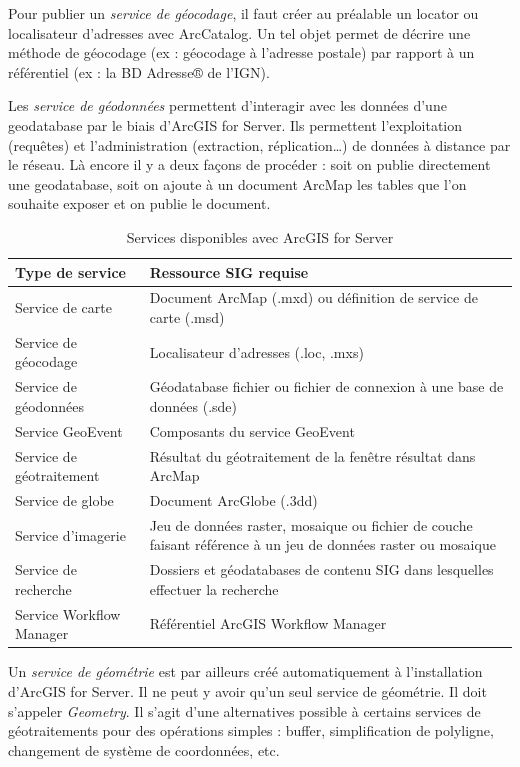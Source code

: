 \documentclass[11pt]{article}
\begin{document}
Pour publier un \textit{service de géocodage}, il faut créer au préalable un locator ou localisateur d'adresses avec ArcCatalog. Un tel objet permet de décrire une méthode de géocodage (ex : géocodage à l'adresse postale) par rapport à un référentiel (ex : la BD Adresse® de l'IGN).

Les \textit{service de géodonnées} permettent d'interagir avec les données d'une geodatabase par le biais d'ArcGIS for Server. Ils permettent l'exploitation (requêtes) et l'administration (extraction, réplication…) de données à distance par le réseau. Là encore il y a deux façons de procéder : soit on publie directement une geodatabase, soit on ajoute à un document ArcMap les tables que l'on souhaite exposer et on publie le document.

\begin{table}[H]
	\begin{center}
		{\renewcommand{\arraystretch}{1.3}
		\begin{tabular}{|l|p{7 cm}|}
			\hline 
			\textbf{Type de service} & \textbf{Ressource SIG requise} \\
			\hline
			Service de carte & Document ArcMap (.mxd) ou définition de service de carte (.msd) \\
			Service de géocodage & Localisateur d'adresses (.loc, .mxs) \\
			Service de géodonnées & Géodatabase fichier ou fichier de connexion à une base de données (.sde) \\
			Service GeoEvent & Composants du service GeoEvent \\
			Service de géotraitement & Résultat du géotraitement de la fenêtre résultat dans ArcMap \\
			Service de globe & Document ArcGlobe (.3dd) \\
			Service d'imagerie & Jeu de données raster, mosaique ou fichier de couche faisant référence à un jeu de données raster ou mosaique \\
			Service de recherche & Dossiers et géodatabases de contenu SIG dans lesquelles effectuer  la recherche \\
			Service Workflow Manager & Référentiel ArcGIS Workflow Manager \\
			\hline
		\end{tabular}
	}
	\end{center}
	\caption{Services disponibles avec ArcGIS for Server}
\end{table}

Un \textit{service de géométrie} est par ailleurs créé automatiquement à l'installation d'ArcGIS for Server. Il ne peut y avoir qu'un seul service de géométrie. Il doit s'appeler \textit{Geometry}. Il s'agit d'une alternatives possible à certains services de géotraitements pour des opérations simples : buffer, simplification de polyligne, changement de système de coordonnées, etc. 
\end{document}
